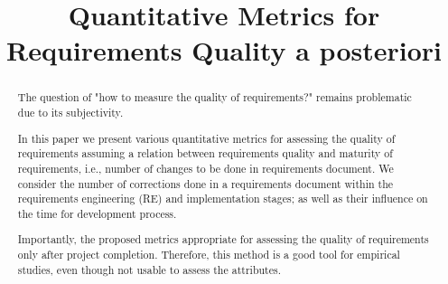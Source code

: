 \documentclass[conference]{IEEEtran}
\begin{document}
\title{Quantitative Metrics for Requirements Quality a posteriori} 

\author{
}

\maketitle

\begin{abstract}
The question of "how to measure the quality of requirements?" remains problematic due to its subjectivity.

In this paper we present various quantitative metrics for assessing the quality of requirements 
assuming a relation between requirements quality and maturity of requirements, i.e., number of changes to be done 
in requirements document. We consider the number of corrections done in a requirements document 
within the requirements engineering (RE) and implementation stages; as well as their influence on the time 
for development process.

Importantly, the proposed metrics appropriate for assessing the quality of requirements only after project completion.
Therefore, this method is a good tool for empirical studies, even though not usable to assess the attributes.
\end{abstract}


\IEEEpeerreviewmaketitle












\end{document}
